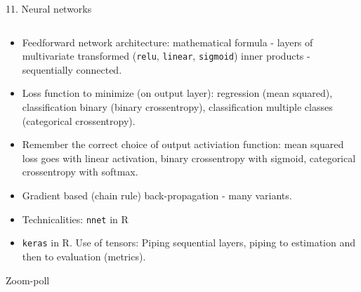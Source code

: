 \documentclass[10pt,ignorenonframetext,]{beamer}
\begin{document}
\begin{frame}[fragile]

\begin{block}{11. Neural networks}

\(~\)

\begin{itemize}
\item
  Feedforward network architecture: mathematical formula - layers of
  multivariate transformed (\texttt{relu}, \texttt{linear},
  \texttt{sigmoid}) inner products - sequentially connected.
  \vspace{2mm}
\item
  Loss function to minimize (on output layer): regression (mean
  squared), classification binary (binary crossentropy), classification
  multiple classes (categorical crossentropy). \vspace{2mm}
\item
  Remember the correct choice of output activiation function: mean
  squared loss goes with linear activation, binary crossentropy with
  sigmoid, categorical crossentropy with softmax. \vspace{2mm}
\item
  Gradient based (chain rule) back-propagation - many variants.
  \vspace{2mm}
\item
  Technicalities: \texttt{nnet} in R \vspace{2mm}
\item
  \texttt{keras} in R. Use of tensors: Piping sequential layers, piping
  to estimation and then to evaluation (metrics).
\end{itemize}

\end{block}

\end{frame}

\begin{frame}{Zoom-poll}
\protect\hypertarget{zoom-poll}{}

\end{frame}
\end{document}
